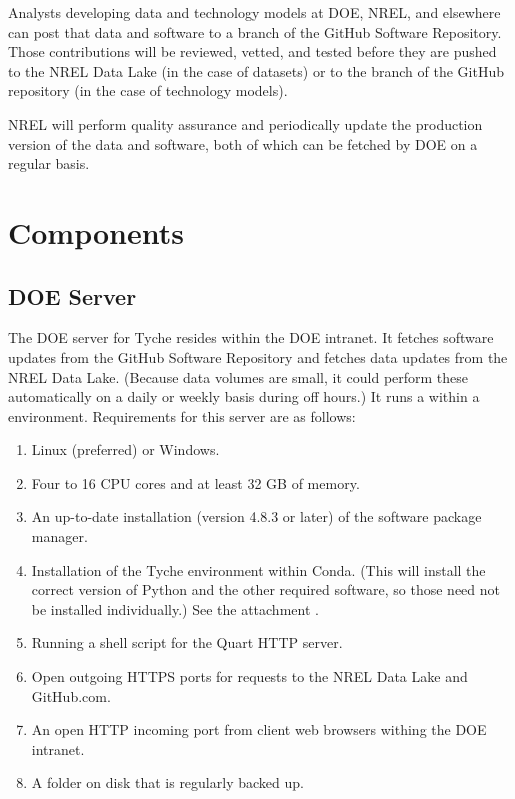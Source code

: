 \documentclass[letterpaper,10pt,english]{sphinxmanual}
\begin{document}
Analysts developing data and technology models at DOE, NREL, and
elsewhere can post that data and software to a branch of the GitHub
Software Repository. Those contributions will be reviewed, vetted, and
tested before they are pushed to the NREL Data Lake (in the case of
datasets) or to the  branch of the GitHub repository (in
the case of technology models).

NREL will perform quality assurance and periodically update the
production version of the data and software, both of which can be
fetched by DOE on a regular basis.


\section{Components}
\label{\detokenize{deployment:components}}

\subsection{DOE Server}
\label{\detokenize{deployment:doe-server}}
The DOE server for Tyche resides within the DOE intranet. It fetches
software updates from the GitHub Software Repository and fetches data
updates from the NREL Data Lake. (Because data volumes are small, it
could perform these automatically on a daily or weekly basis during off
hours.) It runs a  within a
 environment.
Requirements for this server are as follows:
\begin{enumerate}
\def\theenumi{\arabic{enumi}}
\def\labelenumi{\theenumi .}
\makeatletter\def\p@enumii{\p@enumi \theenumi .}\makeatother
\item {} 
Linux (preferred) or Windows.

\item {} 
Four to 16 CPU cores and at least 32 GB of memory.

\item {} 
An up-to-date installation (version 4.8.3 or later) of the
 software
package manager.

\item {} 
Installation of the Tyche environment within Conda. (This will
install the correct version of Python and the other required
software, so those need not be installed individually.) See the
attachment .

\item {} 
Running a shell script for the Quart HTTP server.

\item {} 
Open outgoing HTTPS ports for  requests to the NREL Data Lake
and GitHub.com.

\item {} 
An open HTTP incoming port from client web browsers withing the DOE
intranet.

\item {} 
A folder on disk that is regularly backed up.

\end{enumerate}
\end{document}
